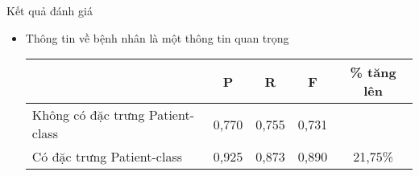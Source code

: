 \begin{frame}{Kết quả đánh giá}
\putlogo
\begin{itemize}
\item Thông tin về bệnh nhân là một thông tin quan trọng
\begin{center}
	\renewcommand{\tabcolsep}{3pt}
	\footnotesize\sffamily
	
	\begin{tabular}{@{}lcccc@{}}
	\toprule
	& \textbf{P} & \textbf{R} & \textbf{F} & \% tăng lên\\
	\midrule
	Không có đặc trưng Patient-class & 0,770 & 0,755 & 0,731 &\\
	Có đặc trưng Patient-class & 0,925 & 0,873 & 0,890 & 21,75\%\\
	\bottomrule
	\end{tabular}
\end{center}
\end{itemize}
\end{frame}
